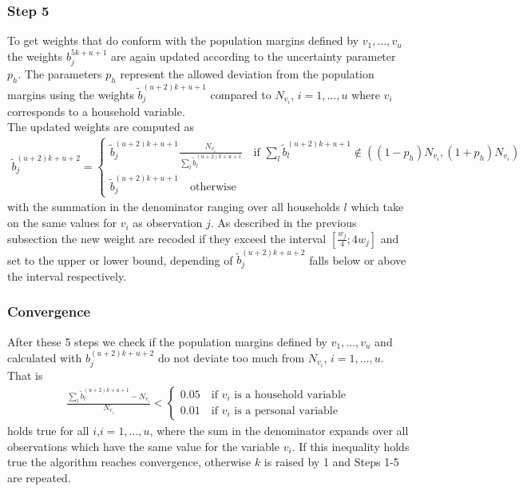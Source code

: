 \documentclass{scrartcl}
\begin{document}
\subsubsection{Step 5}
To get weights that do conform with the population margins defined by $v_1,\ldots,v_u$ the weights $b_j^{5k+u+1}$ are again updated according to the uncertainty parameter $p_h$. The parameters $p_h$ represent the allowed deviation from the population margins using the weights $\tilde{b}_j^{(u+2)k+u+1}$ compared to $N_{v_i}$, $i=1,\ldots,u$ where $v_i$ corresponds to a household variable.\\
The updated weights are computed as
\begin{align*}
  \tilde{b}_j^{(u+2)k+u+2} =
  \begin{cases}
    \tilde{b}_j^{(u+2)k+u+1}\frac{N_{v_i}}{\sum\limits_{l} \tilde{b}_l^{(u+2)k+u+1}} \quad \text{if } \sum\limits_{l} \tilde{b}_l^{(u+2)k+u+1} \notin ((1-p_h)N_{v_i},(1+p_h)N_{v_i}) \\
    \tilde{b}_j^{(u+2)k+u+1} \quad \text{otherwise}
  \end{cases}
\end{align*}
with the summation in the denominator ranging over all households $l$ which take on the same values for $v_i$ as observation $j$. As described in the previous subsection the new weight are recoded if they exceed the interval $[\frac{w_j}{4};4w_j]$ and set to the upper or lower bound, depending of $\tilde{b}_j^{(u+2)k+u+2}$ falls below or above the interval respectively.

\subsubsection{Convergence}
After these 5 steps we check if the population margins defined by $v_1,\ldots,v_u$ and calculated with $b_j^{(u+2)k+u+2}$ do not deviate too much from $N_{v_i}$, $i=1,\ldots,u$. That is
\begin{align*}
  \frac{\sum\limits_{l} \tilde{b}_l^{(u+2)k+u+1} - N_{v_i}}{N_{v_i}} <
  \begin{cases}
  0.05 \quad\text{if }v_i\text{ is a household variable}\\
  0.01 \quad\text{if }v_i\text{ is a personal variable}
  \end{cases}
\end{align*}
holds true for all $i$,$i=1,\ldots,u$, where the sum in the denominator expands over all observations which have the same value for the variable $v_i$.
If this inequality holds true the algorithm reaches convergence, otherwise $k$ is raised by 1 and Steps 1-5 are repeated.
\end{document}
